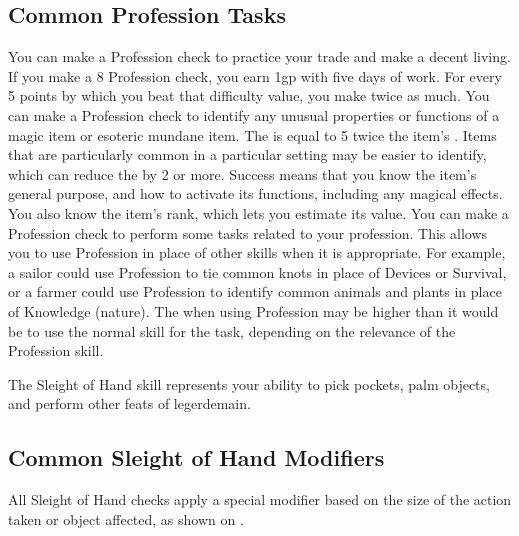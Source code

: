   \subsection{Common Profession Tasks}
     You can make a Profession check to practice your trade and make a decent living.
    If you make a  8 Profession check, you earn 1gp with five days of work.
    For every 5 points by which you beat that difficulty value, you make twice as much.
     You can make a Profession check to identify any unusual properties or functions of a magic item or esoteric mundane item.
    The  is equal to 5 \add twice the item's .
    Items that are particularly common in a particular setting may be easier to identify, which can reduce the  by 2 or more.
    Success means that you know the item's general purpose, and how to activate its functions, including any magical effects.
    You also know the item's rank, which lets you estimate its value.
     You can make a Profession check to perform some tasks related to your profession.
    This allows you to use Profession in place of other skills when it is appropriate.
    For example, a sailor could use Profession to tie common knots in place of Devices or Survival, or a farmer could use Profession to identify common animals and plants in place of Knowledge (nature).
    The  when using Profession may be higher than it would be to use the normal skill for the task, depending on the relevance of the Profession skill.

\newpage
{}
  The Sleight of Hand skill represents your ability to pick pockets, palm objects, and perform other feats of legerdemain.

  \subsection{Common Sleight of Hand Modifiers}
    All Sleight of Hand checks apply a special modifier based on the size of the action taken or object affected, as shown on .

